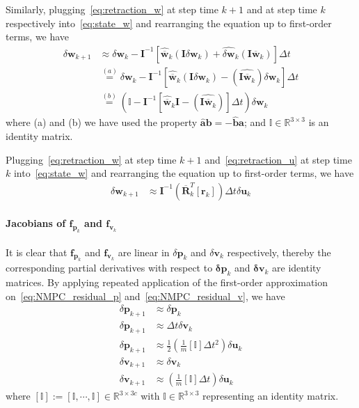 Similarly, plugging~\eqref{eq:retraction_w} at step time $k+1$ and at step time $k$ respectively into~\eqref{eq:state_w} and rearranging the equation up to first-order terms, we have
\begin{align}
\label{eq:f_w_w_1}
\delta\mathbf{w}_{k+1} &\approx \delta\mathbf{w}_k - \mathbf{I}^{-1} \left[ \widehat{\overline{\mathbf{w}}}_k (\mathbf{I}\delta\mathbf{w}_k) + \widehat{\delta\mathbf{w}}_k  (\mathbf{I}\overline{\mathbf{w}}_k)\right] \Delta{t} \nonumber \\
&\overset{(a)}{=}\delta\mathbf{w}_k - \mathbf{I}^{-1} \left[\widehat{\overline{\mathbf{w}}}_k (\mathbf{I}\delta\mathbf{w}_k) - (\widehat{\mathbf{I}\overline{\mathbf{w}}_k}) \delta\mathbf{w}_k \right]\Delta{t} \nonumber \\
&\overset{(b)}{=}\left( \mathbb{I} - \mathbf{I}^{-1} \left[\widehat{\overline{\mathbf{w}}}_k\mathbf{I} - (\widehat{\mathbf{I}\overline{\mathbf{w}}_k}) \right]\Delta{t}\right) \delta\mathbf{w}_k
\end{align}
where (a) and (b) we have used the property $\widehat{\mathbf{a}}\mathbf{b}=-\widehat{\mathbf{b}}\mathbf{a}$; and $\mathbb{I} \in \mathbb{R}^{3\times3}$ is an identity matrix.

Plugging~\eqref{eq:retraction_w} at step time $k+1$ and~\eqref{eq:retraction_u} at step time $k$ into~\eqref{eq:state_w} and rearranging the equation up to first-order terms, we have
\begin{align}
\label{eq:f_w_u_1}
\delta\mathbf{w}_{k+1} &\approx \mathbf{I}^{-1}\left(\overline{\mathbf{R}}_{k}^T[\mathbf{r}_k] \right)\Delta{t}\delta\mathbf{u}_k
\end{align}

\paragraph{Jacobians of $\mathbf{f}_{\mathbf{p}_{k}}$ and $\mathbf{f}_{\mathbf{v}_{k}}$}
It is clear that $\mathbf{f}_{\mathbf{p}_{k}}$ and $\mathbf{f}_{\mathbf{v}_{k}}$ are linear in $\delta{\mathbf{p}_{k}}$ and $\delta{\mathbf{v}_{k}}$ respectively, thereby the corresponding partial derivatives with respect to $\mathbf{\delta p}_k$ and $\mathbf{\delta v}_k$ are identity matrices. By applying repeated application of the first-order approximation on~\eqref{eq:NMPC_residual_p} and~\eqref{eq:NMPC_residual_v}, we have
\begin{align}
\label{eq:f_p_p}
\delta\mathbf{p}_{k+1} &\approx \delta\mathbf{p}_k \\
\label{eq:f_p_v}
\delta\mathbf{p}_{k+1} &\approx \Delta{t} \delta\mathbf{v}_k \\
\label{eq:f_p_u}
\delta\mathbf{p}_{k+1} &\approx \frac{1}{2}(\frac{1}{m}[\mathbb{I}]\Delta{t}^2) \delta\mathbf{u}_k \\
\label{eq:f_v_v}
\delta\mathbf{v}_{k+1} &\approx \delta\mathbf{v}_k \\
\label{eq:f_v_u}
\delta\mathbf{v}_{k+1} &\approx (\frac{1}{m}[\mathbb{I}] \Delta{t}) \delta\mathbf{u}_k
\end{align}
where $[\mathbb{I}]:= \left[ \mathbb{I}, \cdots ,\mathbb{I} \right] \in \mathbb{R}^{3\times3c}$ with $\mathbb{I} \in \mathbb{R}^{3\times3}$ representing an identity matrix.

